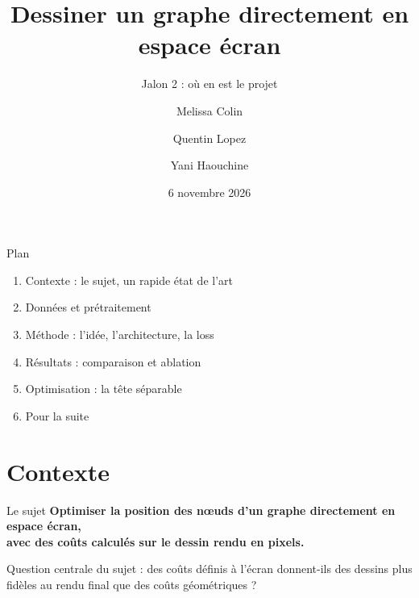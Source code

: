 \documentclass[aspectratio=169,11pt]{beamer}
\title{Dessiner un graphe directement en espace écran}
\subtitle{Jalon 2 : où en est le projet}
\author{Melissa Colin \and Quentin Lopez \and Yani Haouchine}
\institute{ENSEIRB-MATMECA 3A, projet semestriel \quad·\quad Encadrant : Romain Giot (LaBRI)}
\date{6 novembre 2026}
\begin{document}
\maketitle

\begin{frame}{Plan}
\begin{enumerate}
\setlength{\itemsep}{6pt}
\item Contexte : le sujet, un rapide état de l'art
\item Données et prétraitement
\item Méthode : l'idée, l'architecture, la loss
\item Résultats : comparaison et ablation
\item Optimisation : la tête séparable
\item Pour la suite
\end{enumerate}
\end{frame}

\section{Contexte}

\begin{frame}{Le sujet}
\centering
\textbf{Optimiser la position des nœuds d'un graphe directement en espace écran,}\\\textbf{avec des coûts calculés sur le dessin rendu en pixels.}

\vspace{0.6cm}

\vspace{0.5cm}
\small Question centrale du sujet : des coûts définis à l'écran donnent-ils des dessins plus fidèles au rendu final que des coûts géométriques ?
\end{frame}
\end{document}
